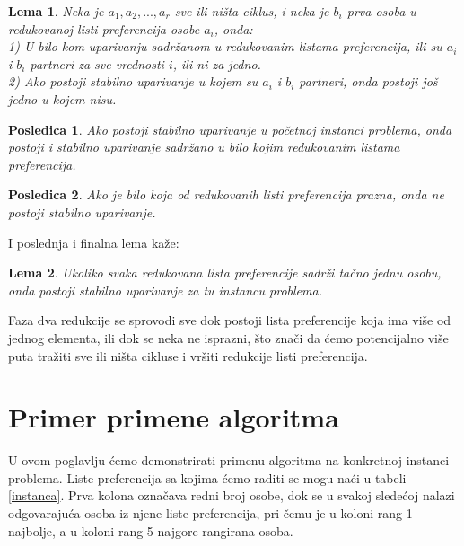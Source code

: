 \documentclass[a4paper]{article}
\newtheorem{lemma}{Lema}
\newtheorem{corollary}{Posledica}[lemma]  %
\begin{document}
\begin{lemma}
        Neka je $a_1, a_2, ..., a_r$ sve ili ništa ciklus, i neka je $b_i$ prva osoba u redukovanoj listi preferencija osobe $a_i$, onda:\\

        1) U bilo kom uparivanju sadržanom u redukovanim listama preferencija, ili su $a_i$ i $b_i$ partneri za sve vrednosti $i$, ili ni za jedno.\\
        
        2) Ako postoji stabilno uparivanje u kojem su $a_i$ i $b_i$ partneri, onda postoji još jedno u kojem nisu.
        
\end{lemma}

\begin{corollary}
        Ako postoji stabilno uparivanje u početnoj instanci problema, onda postoji i stabilno uparivanje sadržano u bilo kojim redukovanim listama preferencija.
\end{corollary}

\begin{corollary}
        Ako je bilo koja od redukovanih listi preferencija prazna, onda ne postoji stabilno uparivanje.        
\end{corollary}

I poslednja i finalna lema kaže:

\begin{lemma}
    Ukoliko svaka redukovana lista preferencije sadrži tačno jednu osobu, onda postoji stabilno uparivanje za tu instancu problema.
\end{lemma}


Faza dva redukcije se sprovodi sve dok postoji lista preferencije koja ima više od jednog elementa, ili dok se neka ne isprazni, što znači da ćemo potencijalno više puta tražiti sve ili ništa cikluse i vršiti redukcije listi preferencija.

\newpage

\section{Primer primene algoritma}

U ovom poglavlju ćemo demonstrirati primenu algoritma na konkretnoj instanci problema. Liste preferencija sa kojima ćemo raditi se mogu naći u tabeli \ref{instanca}. Prva kolona označava redni broj osobe, dok se u svakoj sledećoj nalazi odgovarajuća osoba iz njene liste preferencija, pri čemu je u koloni rang 1 najbolje, a u koloni rang 5 najgore rangirana osoba.
\end{document}
